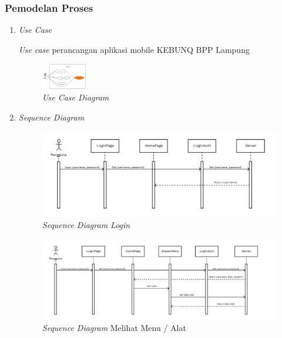 \begin{flushleft}
\begin{justify}
        \subsubsection{Pemodelan Proses}
        \begin{enumerate}[label=\alph*.]
            \item \textit{Use Case}
            
            \textit{Use case} perancangan aplikasi mobile KEBUNQ BPP Lampung
            \begin{figure}[ht]
                \centering
                \includegraphics[width=2cm]{images/bab 4/use-case-user.png}
                \caption{\textit{Use Case Diagram}}
            \end{figure}
          \vspace{2cm}
            \item \textit{Sequence Diagram}
            \begin{figure}[ht]
                \centering
                \includegraphics[width=12cm]{images/bab 4/Sequence login.png}
                \caption{\textit{Sequence Diagram Login}}
            \end{figure}
            \begin{figure}[ht]
                \centering
                \includegraphics[width=12cm]{images/bab 4/buka menu alat.png}
                \caption{\textit{Sequence Diagram} Melihat Menu / Alat}
            \end{figure}
            \begin{figure}[ht]

\end{figure}
\end{enumerate}
\end{justify}
\end{flushleft}

